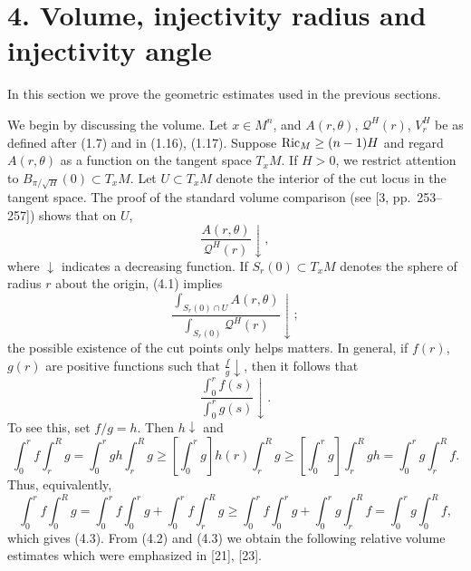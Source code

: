 \chapter{4. Volume, injectivity radius and injectivity angle}

In this section we prove the geometric estimates used in the previous sections.

We begin by discussing the volume. Let $x\in M^n$, and $A(r,\theta)$,
$\mathcal{Q}^H(r)$, $V_r^H$ be as defined after (1.7) and in (1.16), (1.17).
Suppose $\operatorname{Ric}_M\geq (n-1)H$ and regard $A(r,\theta)$ as a function on the tangent
space $T_xM$. If $H>0$, we restrict attention to $B_{\pi/\sqrt{H}}(0)\subset T_xM$.
Let $U\subset T_xM$ denote the interior of the cut locus in the tangent space.
The proof of the standard volume comparison (see [3, pp.\ 253--257]) shows that
on $U$,
\begin{equation}
\tag{4.1}
\frac{A(r,\theta)}{\mathcal{Q}^H(r)}\downarrow,
\end{equation}
where $\downarrow$ indicates a decreasing function. If $S_r(0)\subset T_xM$ denotes
the sphere of radius $r$ about the origin, (4.1) implies
\begin{equation}
\tag{4.2}
\frac{\int_{S_r(0)\cap U} A(r,\theta)}{\int_{S_r(0)} \mathcal{Q}^H(r)}\downarrow;
\end{equation}
the possible existence of the cut points only helps matters. In general, if
$f(r)$, $g(r)$ are positive functions such that $\frac{f}{g}\downarrow$, then it follows that
\begin{equation}
\tag{4.3}
\frac{\int_0^r f(s)}{\int_0^r g(s)}\downarrow.
\end{equation}
To see this, set $f/g=h$. Then $h\downarrow$ and
\begin{equation}
\tag{4.4}
\int_0^r f \int_r^R g
= \int_0^r gh \int_r^R g
\geq \left[\int_0^r g\right] h(r)\int_r^R g
\geq \left[\int_0^r g\right]\int_r^R gh
= \int_0^r g \int_r^R f.
\end{equation}
Thus, equivalently,
\begin{equation}
\tag{4.5}
\int_0^r f \int_0^R g
= \int_0^r f \int_0^r g + \int_0^r f \int_r^R g
\geq \int_0^r f \int_0^r g + \int_0^r g \int_r^R f
= \int_0^r g \int_0^R f,
\end{equation}
which gives (4.3). From (4.2) and (4.3) we obtain the following relative volume
estimates which were emphasized in [21], [23].

